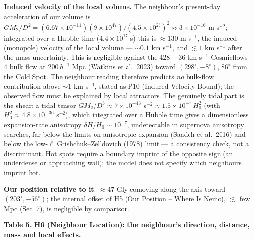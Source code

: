 \documentclass[
  11pt,
]{article}
\begin{document}
\textbf{Induced velocity of the local volume.} The neighbour's
present-day acceleration of our volume is
\(GM_2/D^2 = (6.67\times10^{-11})(9\times10^{47})/(4.5\times10^{26})^2 \approx 3\times10^{-16}\)
m s\(^{-2}\); integrated over a Hubble time (\(4.4\times10^{17}\) s)
this is \(\approx 130\) m s\(^{-1}\), the induced (monopole) velocity of
the local volume --- \(\sim\!0.1\) km s\(^{-1}\), and \(\lesssim 1\) km
s\(^{-1}\) after the mass uncertainty. This is negligible against the
\(428 \pm 36\) km s\(^{-1}\) Cosmicflows-4 bulk flow at \(200\,h^{-1}\)
Mpc (Watkins et al.~2023) toward \((298^\circ, -8^\circ)\), \(86^\circ\)
from the Cold Spot. The neighbour reading therefore predicts \emph{no}
bulk-flow contribution above \(\sim\!1\) km s\(^{-1}\), stated as P10
(Induced-Velocity Bound); the observed flow must be explained by local
attractors. The genuinely tidal part is the shear: a tidal tensor
\(GM_2/D^3 \approx 7\times10^{-43}\)
s\(^{-2} \approx 1.5\times10^{-7}\,H_0^2\) (with
\(H_0^2 \approx 4.8\times10^{-36}\) s\(^{-2}\)), which integrated over a
Hubble time gives a dimensionless expansion-rate anisotropy
\(\delta H/H_0 \sim 10^{-7}\), undetectable in supernova anisotropy
searches, far below the limits on anisotropic expansion (Saadeh et
al.~2016) and below the low-\(\ell\) Grishchuk--Zel'dovich (1978) limit
--- a consistency check, not a discriminant. Hot spots require a
boundary imprint of the opposite sign (an underdense or approaching
wall); the model does not specify which neighbours imprint hot.

\textbf{Our position relative to it.} \(\approx 47\) Gly comoving along
the axis toward \((203^\circ, -56^\circ)\); the internal offset of H5
(Our Position -- Where Is Nemo), \(\lesssim\) few Mpc (Sec. 7), is
negligible by comparison.

\textbf{Table 5. H6 (Neighbour Location): the neighbour's direction,
distance, mass and local effects.}
\end{document}
